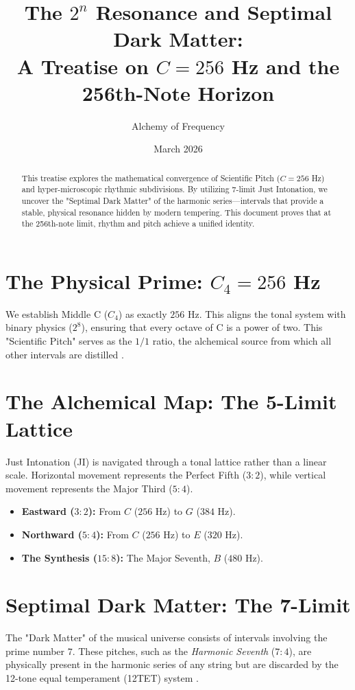 \documentclass[11pt]{article}
\title{The $2^n$ Resonance and Septimal Dark Matter: \\ \large A Treatise on $C=256$ Hz and the 256th-Note Horizon}
\author{Alchemy of Frequency}
\date{March 2026}
\begin{document}
\maketitle

\begin{abstract}
This treatise explores the mathematical convergence of Scientific Pitch ($C=256$ Hz) and hyper-microscopic rhythmic subdivisions. By utilizing 7-limit Just Intonation, we uncover the "Septimal Dark Matter" of the harmonic series—intervals that provide a stable, physical resonance hidden by modern tempering. This document proves that at the 256th-note limit, rhythm and pitch achieve a unified identity.
\end{abstract}

\section{The Physical Prime: $C_4 = 256$ Hz}
We establish Middle C ($C_4$) as exactly $256$ Hz. This aligns the tonal system with binary physics ($2^8$), ensuring that every octave of C is a power of two. This "Scientific Pitch" serves as the $1/1$ ratio, the alchemical source from which all other intervals are distilled \cite{Doty2026}. 

\section{The Alchemical Map: The 5-Limit Lattice}
Just Intonation (JI) is navigated through a tonal lattice rather than a linear scale. Horizontal movement represents the Perfect Fifth ($3:2$), while vertical movement represents the Major Third ($5:4$).

\begin{itemize}
    \item \textbf{Eastward ($3:2$):} From $C$ ($256$ Hz) to $G$ ($384$ Hz).
    \item \textbf{Northward ($5:4$):} From $C$ ($256$ Hz) to $E$ ($320$ Hz).
    \item \textbf{The Synthesis ($15:8$):} The Major Seventh, $B$ ($480$ Hz).
\end{itemize}

\section{Septimal Dark Matter: The 7-Limit}
The "Dark Matter" of the musical universe consists of intervals involving the prime number $7$. These pitches, such as the \textit{Harmonic Seventh} ($7:4$), are physically present in the harmonic series of any string but are discarded by the 12-tone equal temperament (12TET) system \cite{Doty2026}.
\end{document}
